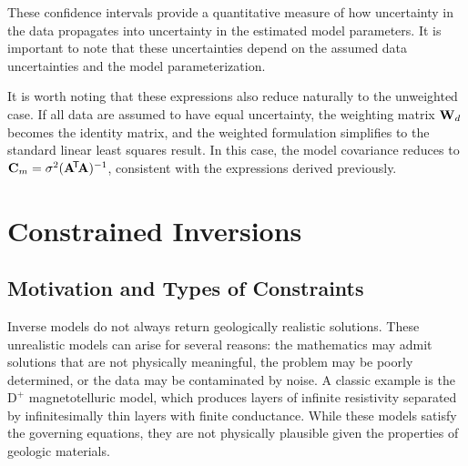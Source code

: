 These confidence intervals provide a quantitative measure of how uncertainty in the data propagates into uncertainty in the estimated model parameters.  It is important to note that these uncertainties depend on the assumed data uncertainties and the model parameterization.

It is worth noting that these expressions also reduce naturally to the unweighted case. If all data are assumed to have equal uncertainty, the weighting matrix $\vb{W}_d$ becomes the identity matrix, and the weighted formulation simplifies to the standard linear least squares result. In this case, the model covariance reduces to $\vb{C}_m = \sigma^2 (\vb{A}\!^\mathsf{T}\! \vb{A})^{-1}$, consistent with the expressions derived previously.

\section{Constrained Inversions}

\subsection{Motivation and Types of Constraints}
Inverse models do not always return geologically realistic solutions. These unrealistic models can arise for several reasons: the mathematics may admit solutions that are not physically meaningful, the problem may be poorly determined, or the data may be contaminated by noise.  A classic example is the $\text{D}^{+}$ magnetotelluric model, which produces layers of infinite resistivity separated by infinitesimally thin layers with finite conductance. While these models satisfy the governing equations, they are not physically plausible given the properties of geologic materials.

